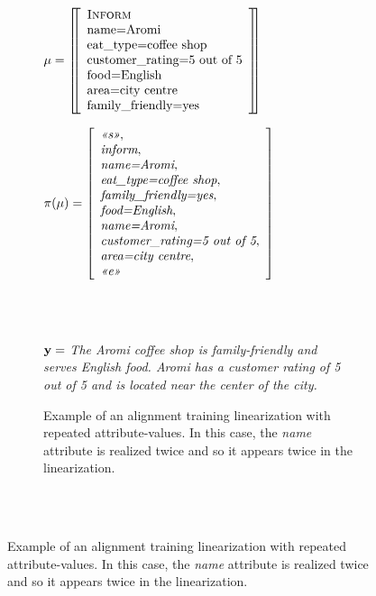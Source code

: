 \begin{figure}[p]
{\begin{minipage}{\textwidth}
\begin{minipage}{0.98\textwidth}
~\\~\\


\begin{subfigure}{\textwidth}
\caption{Example of an alignment training linearization with repeated attribute-values. In this case, the \textit{name} attribute is realized twice and 
so it appears twice in the linearization.}
\center
\begin{minipage}[t]{0.48\textwidth}
\small
$\mu = \left[\!\!\left[\begin{array}{l} 
    \textsc{Inform}\\
    {\textrm{name=Aromi}}\\
    {\textrm{eat\_type=coffee shop}}\\
    {\textrm{customer\_rating=5 out of 5}}\\
    {\textrm{food=English}}\\
    {\textrm{area=city centre}}\\
    {\textrm{family\_friendly=yes}}\\
\end{array} \right]\!\!\right]$
\end{minipage}
 \hfill
\begin{minipage}[t]{0.48\textwidth}
\small
$\pi(\mu) = \left[ \begin{array}{l}
\textit{<<s>>}, \\
\textit{inform},\\
\textit{name=Aromi},\\
\textit{eat\_type=coffee shop},\\
\textit{family\_friendly=yes},\\
\textit{food=English},\\
\textit{name=Aromi},\\
\textit{customer\_rating=5 out of 5},\\
\textit{area=city centre},\\
\textit{<<e>>}\end{array} \right]
$ 
\end{minipage}\\
\begin{minipage}[t]{\textwidth}
~\\[0pt]
$\mathbf{y} = $ \textit{The Aromi coffee shop is family-friendly and serves English food.  Aromi has a customer rating of 5 out of 5 and is located near the center of the city.}
\end{minipage}
\end{subfigure}

~\\~\\



\end{minipage}
\end{minipage}}
\end{figure}

